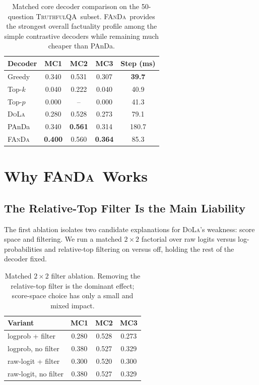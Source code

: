 \documentclass[10pt,twocolumn,letterpaper]{article}
\newcommand{\fanda}{\textsc{FAnDa}}
\newcommand{\dola}{\textsc{DoLa}}
\newcommand{\truthfulqa}{\textsc{TruthfulQA}}
\begin{document}
\begin{table}[t]
    \centering
    \small
    \setlength{\tabcolsep}{4pt}
    \begin{tabular}{lcccc}
        \toprule
        Decoder & MC1 & MC2 & MC3 & Step (ms) \\
        \midrule
        Greedy   & 0.340 & 0.531 & 0.307 & \textbf{39.7} \\
        Top-$k$  & 0.040 & 0.222 & 0.040 & 40.9 \\
        Top-$p$  & 0.000 & --    & 0.000 & 41.3 \\
        \dola    & 0.280 & 0.528 & 0.273 & 79.1 \\
        PAnDa    & 0.340 & \textbf{0.561} & 0.314 & 180.7 \\
        \fanda   & \textbf{0.400} & 0.560 & \textbf{0.364} & 85.3 \\
        \bottomrule
    \end{tabular}
    \caption{Matched core decoder comparison on the 50-question \truthfulqa\ subset. \fanda\ provides the strongest overall factuality profile among the simple contrastive decoders while remaining much cheaper than PAnDa.}
    \label{tab:core-results}
\end{table}

\section{Why \fanda\ Works}

\subsection{The Relative-Top Filter Is the Main Liability}
The first ablation isolates two candidate explanations for \dola's weakness: score space and filtering. We run a matched $2 \times 2$ factorial over raw logits versus log-probabilities and relative-top filtering on versus off, holding the rest of the decoder fixed.

\begin{table}[t]
    \centering
    \small
    \begin{tabular}{lccc}
        \toprule
        Variant & MC1 & MC2 & MC3 \\
        \midrule
        logprob + filter     & 0.280 & 0.528 & 0.273 \\
        logprob, no filter   & 0.380 & 0.527 & 0.329 \\
        raw-logit + filter   & 0.300 & 0.520 & 0.300 \\
        raw-logit, no filter & 0.380 & 0.527 & 0.329 \\
        \bottomrule
    \end{tabular}
    \caption{Matched $2 \times 2$ filter ablation. Removing the relative-top filter is the dominant effect; score-space choice has only a small and mixed impact.}
    \label{tab:filter-ablation}
\end{table}
\end{document}
